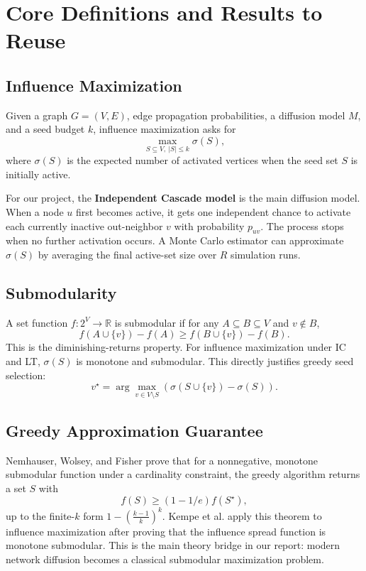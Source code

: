 \documentclass[10pt]{article}
\begin{document}
\section{Core Definitions and Results to Reuse}

\subsection{Influence Maximization}

Given a graph $G=(V,E)$, edge propagation probabilities, a diffusion model $M$,
and a seed budget $k$, influence maximization asks for
\[
    \max_{S\subseteq V,\ |S|\le k} \sigma(S),
\]
where $\sigma(S)$ is the expected number of activated vertices when the seed set
$S$ is initially active.

For our project, the \textbf{Independent Cascade model} is the main diffusion
model.  When a node $u$ first becomes active, it gets one independent chance to
activate each currently inactive out-neighbor $v$ with probability $p_{uv}$.
The process stops when no further activation occurs.  A Monte Carlo estimator
can approximate $\sigma(S)$ by averaging the final active-set size over $R$
simulation runs.

\subsection{Submodularity}

A set function $f:2^V\rightarrow \mathbb{R}$ is submodular if for any
$A\subseteq B\subseteq V$ and $v\notin B$,
\[
    f(A\cup\{v\})-f(A)\ge f(B\cup\{v\})-f(B).
\]
This is the diminishing-returns property. For influence maximization under IC
and LT, $\sigma(S)$ is monotone and submodular. This directly justifies
greedy seed selection:
\[
    v^\star=\arg\max_{v\in V\setminus S}
    \left(\sigma(S\cup\{v\})-\sigma(S)\right).
\]

\subsection{Greedy Approximation Guarantee}

Nemhauser, Wolsey, and Fisher prove that for a nonnegative, monotone submodular
function under a cardinality constraint, the greedy algorithm returns a set $S$
with
\[
    f(S)\ge (1-1/e) f(S^\star),
\]
up to the finite-$k$ form $1-\left(\frac{k-1}{k}\right)^k$. Kempe et al. apply
this theorem to influence maximization after proving that the influence spread
function is monotone submodular. This is the main theory bridge in our report:
modern network diffusion becomes a classical submodular maximization problem.
\end{document}
